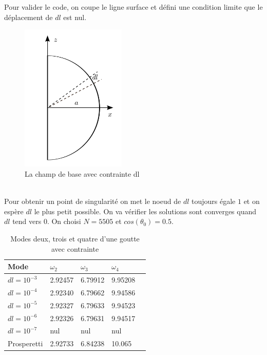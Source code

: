 \documentclass[a4paper]{report}
\begin{document}
\newpage
Pour valider le code, on coupe le ligne surface et défini une condition limite que le déplacement de $dl$ est nul.
\begin{figure}[!htbp]
\centering
\includegraphics[width=5cm]{2_3_2_mesh}
\caption{La champ de base avec contrainte dl}
\end{figure}
\\
Pour obtenir un point de singularité on met le noeud de $dl$ toujours égale $1$ et on espère $dl$ le plus petit possible. On va vérifier les solutions sont converges quand $dl$ tend vers 0. On choisi $N = 5505$ et $cos(\theta_0) = 0.5$.
\begin{table}[htp]
\begin{center}
    \begin{tabular}{ | l | l | l | l | l | }
    \hline
    Mode & $\omega_2$ & $\omega_3$ & $\omega_4$ \\
    \hline
    $dl = 10^{-3}$  & 2.92457 & 6.79912 & 9.95208 \\
    \hline
    $dl = 10^{-4}$  & 2.92340 & 6.79662 & 9.94586 \\
    \hline
    $dl = 10^{-5}$  & 2.92327 & 6.79633 & 9.94523 \\
    \hline
    $dl = 10^{-6}$  & 2.92326 & 6.79631 & 9.94517 \\
    \hline
    $dl = 10^{-7}$  & nul & nul & nul \\
    \hline
    Prosperetti     & 2.92733 & 6.84238 & 10.065 \\
    \hline
    \end{tabular}
\end{center}
\caption{Modes deux, trois et quatre d'une goutte avec contrainte}
\end{table}
\end{document}
